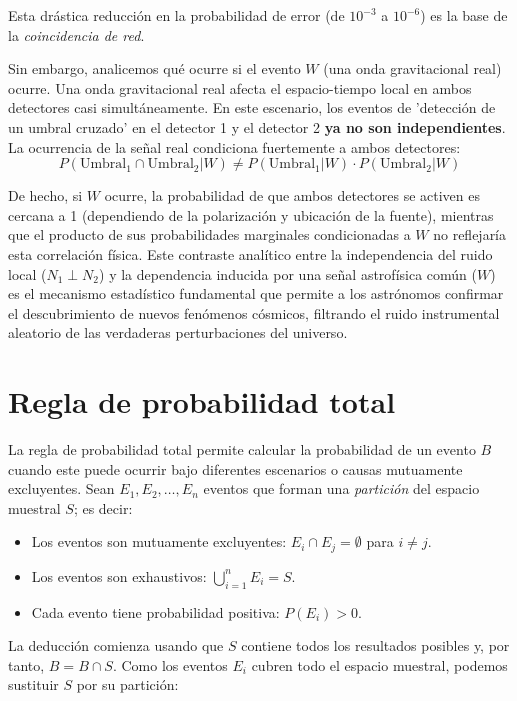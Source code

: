 Esta drástica reducción en la probabilidad de error (de $10^{-3}$ a $10^{-6}$) es la base de la \textit{coincidencia de red}. 

Sin embargo, analicemos qué ocurre si el evento $W$ (una onda gravitacional real) ocurre. Una onda gravitacional real afecta el espacio-tiempo local en ambos detectores casi simultáneamente. En este escenario, los eventos de 'detección de un umbral cruzado' en el detector 1 y el detector 2 \textbf{ya no son independientes}. La ocurrencia de la señal real condiciona fuertemente a ambos detectores:
$$ P(\text{Umbral}_1 \cap \text{Umbral}_2 | W) \neq P(\text{Umbral}_1 | W) \cdot P(\text{Umbral}_2 | W) $$

De hecho, si $W$ ocurre, la probabilidad de que ambos detectores se activen es cercana a 1 (dependiendo de la polarización y ubicación de la fuente), mientras que el producto de sus probabilidades marginales condicionadas a $W$ no reflejaría esta correlación física. Este contraste analítico entre la independencia del ruido local ($N_1 \perp N_2$) y la dependencia inducida por una señal astrofísica común ($W$) es el mecanismo estadístico fundamental que permite a los astrónomos confirmar el descubrimiento de nuevos fenómenos cósmicos, filtrando el ruido instrumental aleatorio de las verdaderas perturbaciones del universo.

\section{Regla de probabilidad total}

La regla de probabilidad total permite calcular la probabilidad de un evento $B$ cuando este puede ocurrir bajo diferentes escenarios o causas mutuamente excluyentes. Sean $E_1,E_2,\dots,E_n$ eventos que forman una \textit{partición} del espacio muestral $S$; es decir:

\begin{itemize}
    \item Los eventos son mutuamente excluyentes: $E_i\cap E_j=\emptyset$ para $i\neq j$.
    \item Los eventos son exhaustivos: $\displaystyle\bigcup_{i=1}^{n}E_i=S$.
    \item Cada evento tiene probabilidad positiva: $P(E_i)>0$.
\end{itemize}

La deducción comienza usando que $S$ contiene todos los resultados posibles y, por tanto, $B=B\cap S$. Como los eventos $E_i$ cubren todo el espacio muestral, podemos sustituir $S$ por su partición:

